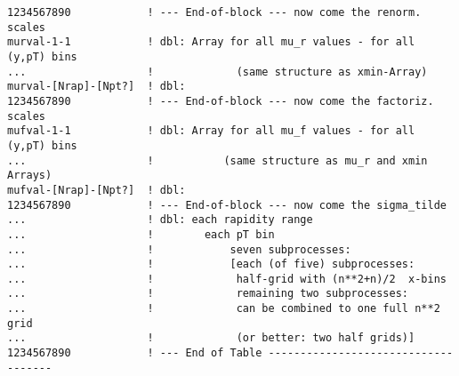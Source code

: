 {\begin{verbatim}
1234567890            ! --- End-of-block --- now come the renorm. scales
murval-1-1            ! dbl: Array for all mu_r values - for all (y,pT) bins
...                   !             (same structure as xmin-Array)
murval-[Nrap]-[Npt?]  ! dbl:
1234567890            ! --- End-of-block --- now come the factoriz. scales
mufval-1-1            ! dbl: Array for all mu_f values - for all (y,pT) bins
...                   !           (same structure as mu_r and xmin Arrays)
mufval-[Nrap]-[Npt?]  ! dbl:
1234567890            ! --- End-of-block --- now come the sigma_tilde
...                   ! dbl: each rapidity range
...                   !        each pT bin
...                   !            seven subprocesses:     
...                   !            [each (of five) subprocesses:
...                   !             half-grid with (n**2+n)/2  x-bins
...                   !             remaining two subprocesses: 
...                   !             can be combined to one full n**2 grid
...                   !             (or better: two half grids)]
1234567890            ! --- End of Table ------------------------------------
\end{verbatim}
}
